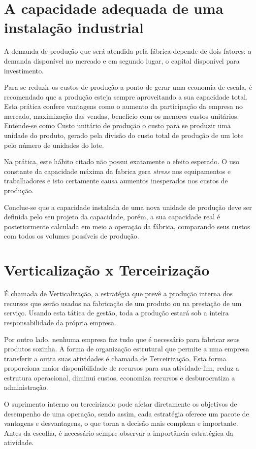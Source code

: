 \section{A capacidade adequada de uma instalação industrial}
A demanda de produção que será atendida pela fábrica depende de dois fatores: a demanda disponível no mercado e em segundo lugar, o capital disponível para investimento.

Para se reduzir os custos de produção a ponto de gerar uma economia de escala, é recomendado que a produção esteja sempre aproveitando a sua capacidade total. Esta prática confere vantagens como o aumento da participação da empresa no mercado, maximização das vendas, beneficio com os menores custos unitários. Entende-se como Custo unitário de produção o custo para se produzir uma unidade do produto, gerado pela divisão do custo total de produção de um lote pelo número de unidades do lote.

Na prática, este hábito citado não possui exatamente o efeito esperado. O uso constante da capacidade máxima da fabrica gera \textit{stress} nos equipamentos e trabalhadores e isto certamente causa aumentos inesperados nos custos de produção.

Conclue-se que a capacidade instalada de uma nova unidade de produção deve ser definida pelo seu projeto da capacidade, porém, a sua capacidade real é posteriormente calculada em meio a operação da fábrica, comparando seus custos com todos os volumes possíveis de produção.

\section{Verticalização x Terceirização}
É chamada de Verticalização, a estratégia que prevê a produção interna dos recursos que serão usados na fabricação de um produto ou na prestação de um serviço. Usando esta tática de gestão, toda a produção estará sob a inteira responsabilidade da própria empresa.

Por outro lado, nenhuma empresa faz tudo que é necessário para fabricar seus produtos sozinha. A forma de organização estrutural que permite a uma empresa transferir a outra suas atividades é chamada de Terceirização. Esta forma proporciona maior disponibilidade de recursos para sua atividade-fim, reduz a estrutura operacional, diminui custos, economiza recursos e desburocratiza a administração.

\par O suprimento interno ou terceirizado pode afetar diretamente os objetivos de desempenho de uma operação, sendo assim, cada estratégia oferece um pacote de vantagens e desvantagens, o que torna a decisão mais complexa e importante. Antes da escolha, é necessário sempre observar a importância estratégica da atividade.


